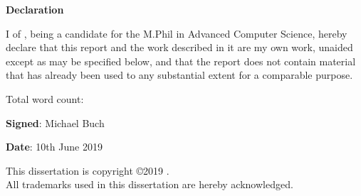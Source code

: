 \newpage
{\Huge \bf Declaration}

\vspace{24pt} 

I \authorname of \authorcollege, being a candidate for the M.Phil in
Advanced Computer Science, hereby declare that this report and the
work described in it are my own work, unaided except as may be
specified below, and that the report does not contain material that
has already been used to any substantial extent for a comparable
purpose.

\vspace{24pt}
Total word count: \wordcount

\vspace{60pt}
\textbf{Signed}: Michael Buch

\vspace{12pt}
\textbf{Date}: 10th June 2019


\vfill

This dissertation is copyright \copyright 2019 \authorname. 
\\
All trademarks used in this dissertation are hereby acknowledged.



\newpage
\vspace*{\fill}
